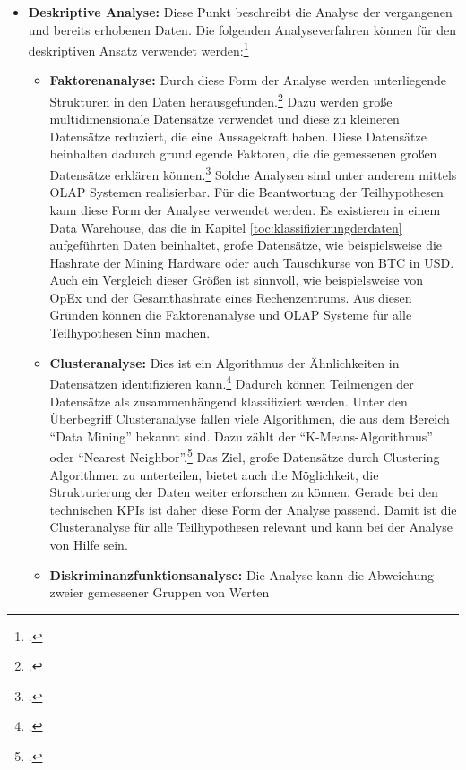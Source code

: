 \begin{itemize}
    \item \textbf{Deskriptive Analyse: }Diese Punkt beschreibt die Analyse der vergangenen und bereits erhobenen
    Daten. Die folgenden Analyseverfahren können für den deskriptiven Ansatz verwendet
    werden:\footcite[Vgl.][S. 97ff]{bihani2014comparative}
    \begin{itemize}
        \item \textbf{Faktorenanalyse: }Durch diese Form der Analyse werden unterliegende Strukturen in den Daten
        herausgefunden.\footcite[Vgl.][S. 97f]{bihani2014comparative} Dazu werden große multidimensionale Datensätze verwendet
        und diese zu kleineren Datensätze reduziert, die eine Aussagekraft haben. Diese Datensätze beinhalten dadurch
        grundlegende Faktoren, die die gemessenen großen Datensätze erklären
        können.\footcite[Vgl.][S. 97f]{bihani2014comparative} Solche Analysen sind unter anderem mittels \ac{OLAP} Systemen
        realisierbar. Für die Beantwortung der Teilhypothesen kann diese Form der Analyse verwendet werden. Es existieren
        in einem Data Warehouse, das die in Kapitel \ref{toc:klassifizierungderdaten} aufgeführten Daten beinhaltet, große
        Datensätze, wie beispielsweise die Hashrate der Mining Hardware oder auch Tauschkurse von \ac{BTC} in \ac{USD}. Auch
        ein Vergleich dieser Größen ist sinnvoll, wie beispielsweise von \ac{OpEx} und der Gesamthashrate eines Rechenzentrums.
        Aus diesen Gründen können die Faktorenanalyse und \ac{OLAP} Systeme für alle Teilhypothesen Sinn machen.
        \item \textbf{Clusteranalyse: }Dies ist ein Algorithmus der Ähnlichkeiten in Datensätzen identifizieren
        kann.\footcite[Vgl.][S. 98]{bihani2014comparative} Dadurch können Teilmengen der Datensätze als zusammenhängend
        klassifiziert werden. Unter den Überbegriff Clusteranalyse fallen viele Algorithmen, die aus dem Bereich "`Data Mining"'
        bekannt sind. Dazu zählt der "`K-Means-Algorithmus"' oder "`Nearest Neighbor"'.\footcite[Vgl.][S. 98]{bihani2014comparative}
        Das Ziel, große Datensätze durch Clustering Algorithmen zu unterteilen, bietet auch die Möglichkeit, die Strukturierung
        der Daten weiter erforschen zu können. Gerade bei den technischen \acp{KPI} ist daher diese Form der Analyse passend.
        Damit ist die Clusteranalyse für alle Teilhypothesen relevant und kann bei der Analyse von Hilfe sein. 
        \item \textbf{Diskriminanzfunktionsanalyse: }Die Analyse kann die Abweichung zweier gemessener Gruppen von Werten

\end{itemize}
\end{itemize}
